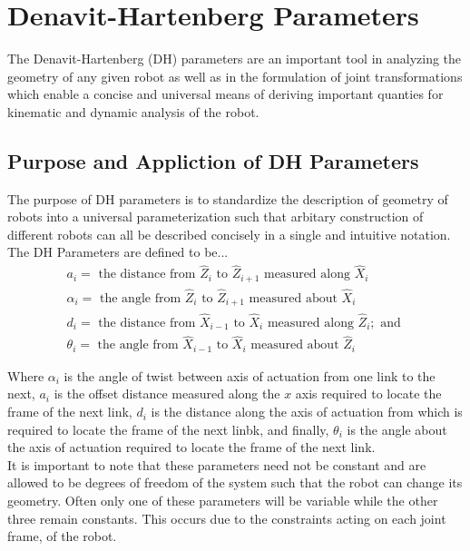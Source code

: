 \section*{Denavit-Hartenberg Parameters}

The Denavit-Hartenberg (DH) parameters are an important tool in analyzing the geometry of any given robot as well as in the formulation of joint transformations which enable a concise and universal means of deriving important quanties for kinematic and dynamic analysis of the robot.

\subsection*{Purpose and Appliction of DH Parameters}

The purpose of DH parameters is to standardize the description of geometry of robots into a universal parameterization such that arbitary construction of different robots can all be described concisely in a single and intuitive notation. \\

\noindent The DH Parameters are defined to be...
$$
\begin{array}{l}
a_{i}=\text { the distance from } \hat{Z}_{i} \text { to } \hat{Z}_{i+1} \text { measured along } \hat{X}_{i} \\
\alpha_{i}=\text { the angle from } \hat{Z}_{i} \text { to } \hat{Z}_{i+1} \text { measured about } \hat{X}_{i} \\
d_{i}=\text { the distance from } \hat{X}_{i-1} \text { to } \hat{X}_{i} \text { measured along } \hat{Z}_{i} ; \text { and } \\
\theta_{i}=\text { the angle from } \hat{X}_{i-1} \text { to } \hat{X}_{i} \text { measured about } \hat{Z}_{i}
\end{array}
$$

\noindent Where $\alpha_i$ is the angle of twist between axis of actuation from one link to the next, $a_i$ is the offset distance measured along the $x$ axis required to locate the frame of the next link, $d_i$ is the distance along the axis of actuation from which is required to locate the frame of the next linbk, and finally, $\theta_i$ is the angle about the axis of actuation required to locate the frame of the next link. \\

\noindent It is important to note that these parameters need not be constant and are allowed to be degrees of freedom of the system such that the robot can change its geometry. Often only one of these parameters will be variable while the other three remain constants. This occurs due to the constraints acting on each joint frame, of the robot.


